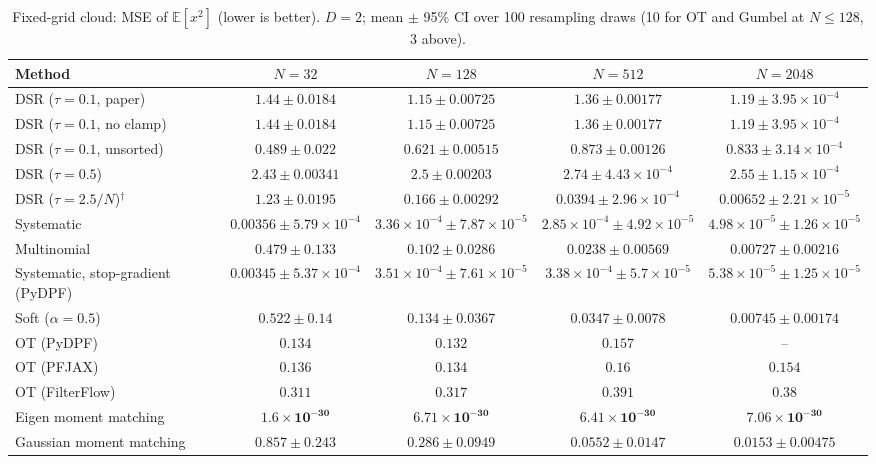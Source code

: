 \begin{table}[H]
\centering
\small
\caption{Fixed-grid cloud: MSE of $\mathbb{E}[x^2]$ (lower is better). $D{=}2$; mean $\pm$ 95\% CI over 100 resampling draws (10 for OT and Gumbel at $N\le128$, 3 above).}
\label{tab:static-fixed-estimator_mse_x2}
\begin{adjustbox}{max width=\linewidth}
\begin{tabular}{lcccc}
\toprule
Method & $N{=}32$ & $N{=}128$ & $N{=}512$ & $N{=}2048$ \\
\midrule
DSR ($\tau{=}0.1$, paper) & $1.44\pm0.0184$ & $1.15\pm0.00725$ & $1.36\pm0.00177$ & $1.19\pm3.95\times10^{-4}$ \\
DSR ($\tau{=}0.1$, no clamp) & $1.44\pm0.0184$ & $1.15\pm0.00725$ & $1.36\pm0.00177$ & $1.19\pm3.95\times10^{-4}$ \\
DSR ($\tau{=}0.1$, unsorted) & $0.489\pm0.022$ & $0.621\pm0.00515$ & $0.873\pm0.00126$ & $0.833\pm3.14\times10^{-4}$ \\
DSR ($\tau{=}0.5$) & $2.43\pm0.00341$ & $2.5\pm0.00203$ & $2.74\pm4.43\times10^{-4}$ & $2.55\pm1.15\times10^{-4}$ \\
DSR ($\tau{=}2.5/N$)$^\dagger$ & $1.23\pm0.0195$ & $0.166\pm0.00292$ & $0.0394\pm2.96\times10^{-4}$ & $0.00652\pm2.21\times10^{-5}$ \\
\midrule
Systematic & $0.00356\pm5.79\times10^{-4}$ & $3.36\times10^{-4}\pm7.87\times10^{-5}$ & $2.85\times10^{-4}\pm4.92\times10^{-5}$ & $4.98\times10^{-5}\pm1.26\times10^{-5}$ \\
Multinomial & $0.479\pm0.133$ & $0.102\pm0.0286$ & $0.0238\pm0.00569$ & $0.00727\pm0.00216$ \\
Systematic, stop-gradient (PyDPF) & $0.00345\pm5.37\times10^{-4}$ & $3.51\times10^{-4}\pm7.61\times10^{-5}$ & $3.38\times10^{-4}\pm5.7\times10^{-5}$ & $5.38\times10^{-5}\pm1.25\times10^{-5}$ \\
Soft ($\alpha{=}0.5$) & $0.522\pm0.14$ & $0.134\pm0.0367$ & $0.0347\pm0.0078$ & $0.00745\pm0.00174$ \\
OT (PyDPF) & $0.134$ & $0.132$ & $0.157$ & -- \\
OT (PFJAX) & $0.136$ & $0.134$ & $0.16$ & $0.154$ \\
OT (FilterFlow) & $0.311$ & $0.317$ & $0.391$ & $0.38$ \\
Eigen moment matching & $\mathbf{1.6\times10^{-30}}$ & $\mathbf{6.71\times10^{-30}}$ & $\mathbf{6.41\times10^{-30}}$ & $\mathbf{7.06\times10^{-30}}$ \\
Gaussian moment matching & $0.857\pm0.243$ & $0.286\pm0.0949$ & $0.0552\pm0.0147$ & $0.0153\pm0.00475$ \\

\end{tabular}
\end{adjustbox}
\end{table}
